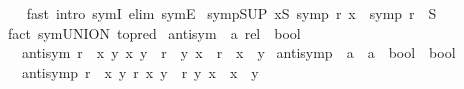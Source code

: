 \begin{isabellebody}
%
\isadelimproof
\ \ %
\endisadelimproof
%
\isatagproof
{}\isamarkupfalse%
\ {\isacharparenleft}{\kern0pt}fast\ intro{\isacharcolon}{\kern0pt}\ symI\ elim{\isacharcolon}{\kern0pt}\ symE{\isacharparenright}{\kern0pt}%
\endisatagproof
{\isafoldproof}%
%
\isadelimproof
\isanewline
%
\endisadelimproof
\isanewline
{}\isamarkupfalse%
\ symp{\isacharunderscore}{\kern0pt}SUP{\isacharcolon}{\kern0pt}\ {\isachardoublequoteopen}{\isasymforall}x{\isasymin}S{\isachardot}{\kern0pt}\ symp\ {\isacharparenleft}{\kern0pt}r\ x{\isacharparenright}{\kern0pt}\ {\isasymLongrightarrow}\ symp\ {\isacharparenleft}{\kern0pt}{\isasymSqunion}{\isacharparenleft}{\kern0pt}r\ {\isacharbackquote}{\kern0pt}\ S{\isacharparenright}{\kern0pt}{\isacharparenright}{\kern0pt}{\isachardoublequoteclose}\isanewline
%
\isadelimproof
\ \ %
\endisadelimproof
%
\isatagproof
{}\isamarkupfalse%
\ {\isacharparenleft}{\kern0pt}fact\ sym{\isacharunderscore}{\kern0pt}UNION\ {\isacharbrackleft}{\kern0pt}to{\isacharunderscore}{\kern0pt}pred{\isacharbrackright}{\kern0pt}{\isacharparenright}{\kern0pt}%
\endisatagproof
{\isafoldproof}%
%
\isadelimproof
%
\endisadelimproof
%
\isadelimdocument
%
\endisadelimdocument
%
\isatagdocument
%
\isamarkuptrue%
%
\endisatagdocument
{\isafolddocument}%
%
\isadelimdocument
%
\endisadelimdocument
{}\isamarkupfalse%
\ antisym\ {\isacharcolon}{\kern0pt}{\isacharcolon}{\kern0pt}\ {\isachardoublequoteopen}{\isacharprime}{\kern0pt}a\ rel\ {\isasymRightarrow}\ bool{\isachardoublequoteclose}\isanewline
\ \ \ {\isachardoublequoteopen}antisym\ r\ {\isasymlongleftrightarrow}\ {\isacharparenleft}{\kern0pt}{\isasymforall}x\ y{\isachardot}{\kern0pt}\ {\isacharparenleft}{\kern0pt}x{\isacharcomma}{\kern0pt}\ y{\isacharparenright}{\kern0pt}\ {\isasymin}\ r\ {\isasymlongrightarrow}\ {\isacharparenleft}{\kern0pt}y{\isacharcomma}{\kern0pt}\ x{\isacharparenright}{\kern0pt}\ {\isasymin}\ r\ {\isasymlongrightarrow}\ x\ {\isacharequal}{\kern0pt}\ y{\isacharparenright}{\kern0pt}{\isachardoublequoteclose}\isanewline
\isanewline
{}\isamarkupfalse%
\ antisymp\ {\isacharcolon}{\kern0pt}{\isacharcolon}{\kern0pt}\ {\isachardoublequoteopen}{\isacharparenleft}{\kern0pt}{\isacharprime}{\kern0pt}a\ {\isasymRightarrow}\ {\isacharprime}{\kern0pt}a\ {\isasymRightarrow}\ bool{\isacharparenright}{\kern0pt}\ {\isasymRightarrow}\ bool{\isachardoublequoteclose}\isanewline
\ \ \ {\isachardoublequoteopen}antisymp\ r\ {\isasymlongleftrightarrow}\ {\isacharparenleft}{\kern0pt}{\isasymforall}x\ y{\isachardot}{\kern0pt}\ r\ x\ y\ {\isasymlongrightarrow}\ r\ y\ x\ {\isasymlongrightarrow}\ x\ {\isacharequal}{\kern0pt}\ y{\isacharparenright}{\kern0pt}{\isachardoublequoteclose}\isanewline

\end{isabellebody}
